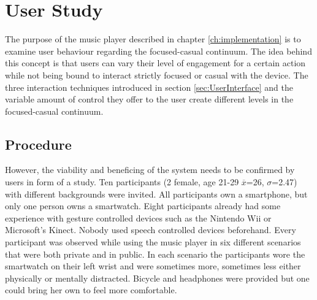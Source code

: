 \chapter{User Study}\label{ch:userStudy}









The purpose of the music player described in chapter \ref{ch:implementation} is to examine user behaviour regarding the focused-casual continuum. The idea behind this concept is that users can vary their level of engagement for a certain action while not being bound to interact strictly focused or casual with the device. The three interaction techniques introduced in section \ref{sec:UserInterface} and the variable amount of control they offer to the user create different levels in the focused-casual continuum. \\

\section{Procedure}\label{sec:studyProcedure}
However, the viability and beneficing of the system needs to be confirmed by users in form of a study. Ten participants (2 female, age 21-29 $\overline{x}$=26, $\sigma$=2.47) with different backgrounds were invited. All participants own a smartphone, but only one person owns a smartwatch. Eight participants already had some experience with gesture controlled devices such as the Nintendo Wii or Microsoft's Kinect. Nobody used speech controlled devices beforehand. Every participant was observed while using the music player in six different scenarios that were both private and in public. In each scenario the participants wore the smartwatch on their left wrist and were sometimes more, sometimes less either physically or mentally distracted. Bicycle and headphones were provided but one could bring her own to feel more comfortable. \\

